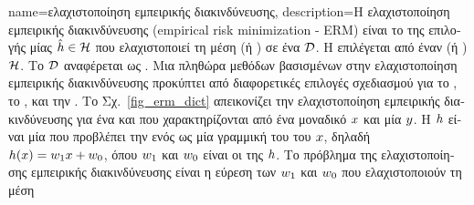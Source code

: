 {name={\foreignlanguage{greek}{ελαχιστοποίηση εμπειρικής διακινδύνευσης}}, 
	description={\foreignlanguage{greek}{Η ελαχιστο\-ποί\-ηση εμπειρικής 
		διακινδύνευσης} 
		(empirical risk minimization - ERM) \foreignlanguage{greek}{είναι το}  \foreignlanguage{greek}{της  
		επιλογής μίας}  $\hat{h} \in \mathcal{H}$ \foreignlanguage{greek}{που ελαχιστοποιεί τη}
		\foreignlanguage{greek}{μέση}  (\foreignlanguage{greek}{ή} ) \foreignlanguage{greek}{σε ένα} 
		 $\mathcal{D}$. \foreignlanguage{greek}{Η}  \foreignlanguage{greek}{επιλέγεται 
		από έναν}  (\foreignlanguage{greek}{ή} ) $\mathcal{H}$. \foreignlanguage{greek}{Το} 
		 $\mathcal{D}$ \foreignlanguage{greek}{αναφέρεται ως} . \foreignlanguage{greek}{Μια πληθώρα 
		μεθόδων}  \foreignlanguage{greek}{βασισμένων στην ελαχιστο\-ποί\-ηση εμπειρικής διακινδύνευσης προκύπτει από
		διαφορετικές επιλογές σχεδιασμού για το} , \foreignlanguage{greek}{το} , 
		\foreignlanguage{greek}{και την}  \cite[\foreignlanguage{greek}{Κεφ.} 3]{MLBasics}.
		\foreignlanguage{greek}{Το Σχ.}\ \ref{fig_erm_dict} \foreignlanguage{greek}{απεικονίζει την ελαχιστοποίηση εμπειρικής διακινδύνευσης 
		για ένα}  \foreignlanguage{greek}{και}  \foreignlanguage{greek}{που χαρακτηρίζονται 
		από ένα μοναδικό}  $x$ \foreignlanguage{greek}{και μία}  $y$. 
		\foreignlanguage{greek}{Η}  $h$ \foreignlanguage{greek}{είναι μία}  
		\foreignlanguage{greek}{που προβλέπει την}  \foreignlanguage{greek}{ενός}  
		\foreignlanguage{greek}{ως μία γραμμική}  \foreignlanguage{greek}{του}  
		\foreignlanguage{greek}{του} $x$, \foreignlanguage{greek}{δηλαδή $h(x) = w_{1} x + w_{0}$, 
		όπου $w_{1}$ και $w_{0}$ είναι οι}  \foreignlanguage{greek}{της} 
		 $h$. \foreignlanguage{greek}{Το πρόβλημα της ελαχιστοποίησης εμπειρικής διακινδύνευσης 
		είναι η εύρεση των}  $w_{1}$ \foreignlanguage{greek}{και $w_{0}$ που ελαχιστοποιούν τη μέση} 
}}
